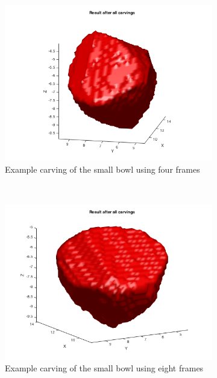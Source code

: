 \documentclass[10pt,twocolumn,letterpaper]{article}
\begin{document}
\begin{figure}
    \centering
    \begin{subfigure}[t]{0.3\textwidth}
        \centering
        \includegraphics[width=\textwidth]{bluebowl2_4.png}
        \caption{Example carving of the small bowl using four frames}
    \end{subfigure}
    ~ 
    \begin{subfigure}[t]{0.3\textwidth}
        \centering
        \includegraphics[width=\textwidth]{bluebowl2_8.png}
        \caption{Example carving of the small bowl using eight frames}
    \end{subfigure}
    ~
    \begin{subfigure}[t]{0.3\textwidth}

\end{subfigure}
\end{figure}
\end{document}
